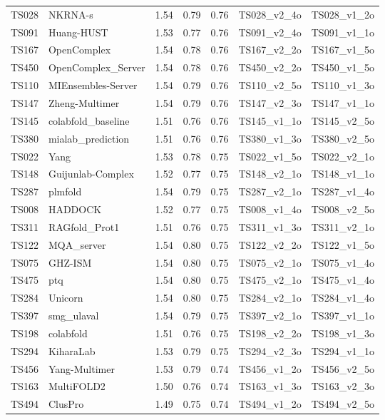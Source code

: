 \begin{longtable}{lllllll}
TS028 & NKRNA-s & 1.54 & 0.79 & 0.76 & TS028\_v2\_4o & TS028\_v1\_2o \\ 
TS091 & Huang-HUST & 1.53 & 0.77 & 0.76 & TS091\_v2\_4o & TS091\_v1\_1o \\ 
TS167 & OpenComplex & 1.54 & 0.78 & 0.76 & TS167\_v2\_2o & TS167\_v1\_5o \\ 
TS450 & OpenComplex\_Server & 1.54 & 0.78 & 0.76 & TS450\_v2\_2o & TS450\_v1\_5o \\ 
TS110 & MIEnsembles-Server & 1.54 & 0.79 & 0.76 & TS110\_v2\_5o & TS110\_v1\_3o \\ 
TS147 & Zheng-Multimer & 1.54 & 0.79 & 0.76 & TS147\_v2\_3o & TS147\_v1\_1o \\ 
TS145 & colabfold\_baseline & 1.51 & 0.76 & 0.76 & TS145\_v1\_1o & TS145\_v2\_5o \\ 
TS380 & mialab\_prediction & 1.51 & 0.76 & 0.76 & TS380\_v1\_3o & TS380\_v2\_5o \\ 
TS022 & Yang & 1.53 & 0.78 & 0.75 & TS022\_v1\_5o & TS022\_v2\_1o \\ 
TS148 & Guijunlab-Complex & 1.52 & 0.77 & 0.75 & TS148\_v2\_1o & TS148\_v1\_1o \\ 
TS287 & plmfold & 1.54 & 0.79 & 0.75 & TS287\_v2\_1o & TS287\_v1\_4o \\ 
TS008 & HADDOCK & 1.52 & 0.77 & 0.75 & TS008\_v1\_4o & TS008\_v2\_5o \\ 
TS311 & RAGfold\_Prot1 & 1.51 & 0.76 & 0.75 & TS311\_v1\_3o & TS311\_v2\_1o \\ 
TS122 & MQA\_server & 1.54 & 0.80 & 0.75 & TS122\_v2\_2o & TS122\_v1\_5o \\ 
TS075 & GHZ-ISM & 1.54 & 0.80 & 0.75 & TS075\_v2\_1o & TS075\_v1\_4o \\ 
TS475 & ptq & 1.54 & 0.80 & 0.75 & TS475\_v2\_1o & TS475\_v1\_4o \\ 
TS284 & Unicorn & 1.54 & 0.80 & 0.75 & TS284\_v2\_1o & TS284\_v1\_4o \\ 
TS397 & smg\_ulaval & 1.54 & 0.79 & 0.75 & TS397\_v2\_1o & TS397\_v1\_1o \\ 
TS198 & colabfold & 1.51 & 0.76 & 0.75 & TS198\_v2\_2o & TS198\_v1\_3o \\ 
TS294 & KiharaLab & 1.53 & 0.79 & 0.75 & TS294\_v2\_3o & TS294\_v1\_1o \\ 
TS456 & Yang-Multimer & 1.53 & 0.79 & 0.74 & TS456\_v1\_2o & TS456\_v2\_5o \\ 
TS163 & MultiFOLD2 & 1.50 & 0.76 & 0.74 & TS163\_v1\_3o & TS163\_v2\_3o \\ 
TS494 & ClusPro & 1.49 & 0.75 & 0.74 & TS494\_v1\_2o & TS494\_v2\_5o \\ 

\end{longtable}
